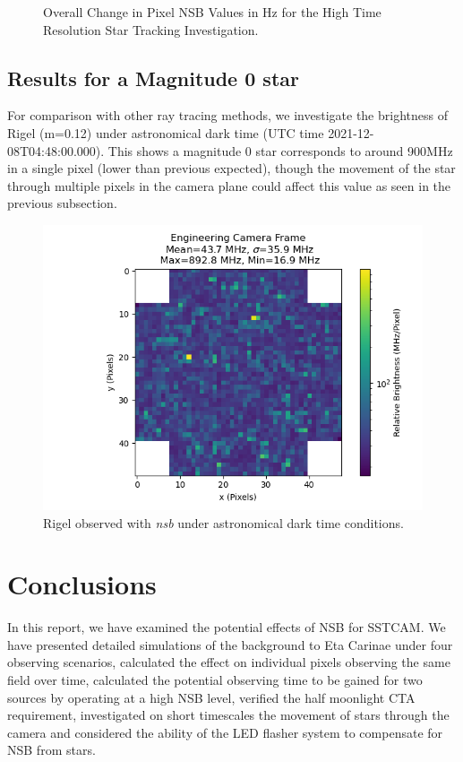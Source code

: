 \begin{figure}[ht]
\begin{minipage}{\linewidth}
\caption{Overall Change in Pixel NSB Values in Hz for the High Time Resolution Star Tracking Investigation.}

\end{minipage}
\label{fig:zenithpixelchange}
\end{figure} 

\subsection{Results for a Magnitude 0 star}
For comparison with other ray tracing methods, we investigate the brightness of Rigel (m=0.12) under astronomical dark time (UTC time 2021-12-08T04:48:00.000). This shows a magnitude 0 star corresponds to around 900MHz in a single pixel (lower than previous expected), though the movement of the star through multiple pixels in the camera plane could affect this value as seen in the previous subsection.
\begin{figure}[h]
\begin{centering}
\includegraphics[width=0.7\columnwidth]{./figures/Hz_pixel_Rigel.png}
\caption{Rigel observed with \textit{nsb} under astronomical dark time conditions.}
\label{fig:rigel}
\end{centering}
\end{figure}
\section{Conclusions}

In this report, we have examined the potential effects of NSB for SSTCAM. We have presented detailed simulations of the background to Eta Carinae under four observing scenarios, calculated the effect on individual pixels observing the same field over time, calculated the potential observing time to be gained for two sources by operating at a high NSB level, verified the half moonlight CTA requirement, investigated on short timescales the movement of stars through the camera and considered the ability of the LED flasher system to compensate for NSB from stars.

